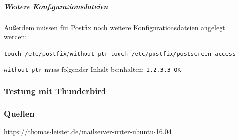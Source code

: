 \subparagraph{Weitere Konfigurationsdateien}
Außerdem müssen für Postfix noch weitere Konfigurationsdateien angelegt werden:

\verb|touch /etc/postfix/without_ptr|\newline
\verb|touch /etc/postfix/postscreen_access|\newline

\verb|without_ptr| muss folgender Inhalt beinhalten:\newline
\verb|1.2.3.3 OK|\newline











\subsubsection{Testung mit Thunderbird}


\subsubsection{Quellen}
\url{https://thomas-leister.de/mailserver-unter-ubuntu-16.04}


